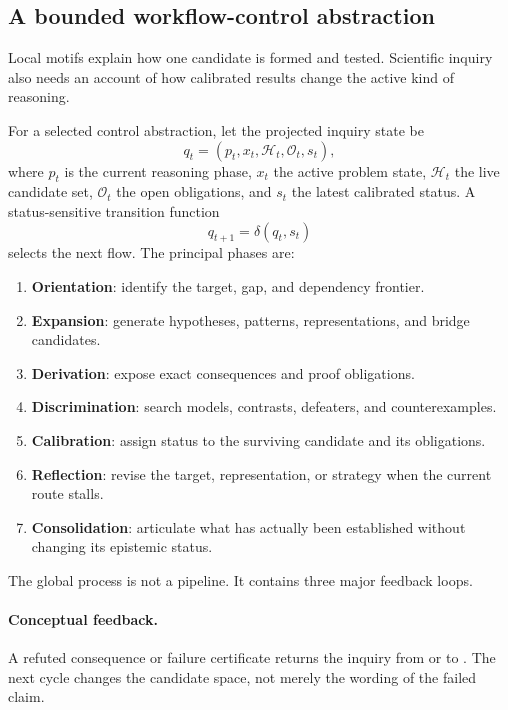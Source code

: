 \subsection{A bounded workflow-control abstraction}

Local motifs explain how one candidate is formed and tested. Scientific inquiry
also needs an account of how calibrated results change the active kind of
reasoning.

For a selected control abstraction, let the projected inquiry state be
\[
  q_t=(p_t,x_t,\mathcal{H}_t,\mathcal{O}_t,s_t),
\]
where $p_t$ is the current reasoning phase, $x_t$ the active problem state,
$\mathcal{H}_t$ the live candidate set, $\mathcal{O}_t$ the open obligations,
and $s_t$ the latest calibrated status. A status-sensitive transition function
\[
  q_{t+1}=\delta(q_t,s_t)
\]
selects the next flow. The principal phases are:

\begin{enumerate}[leftmargin=*,itemsep=0.3em]
\item \textbf{Orientation}: identify the target, gap, and dependency frontier.
\item \textbf{Expansion}: generate hypotheses, patterns, representations, and
  bridge candidates.
\item \textbf{Derivation}: expose exact consequences and proof obligations.
\item \textbf{Discrimination}: search models, contrasts, defeaters, and
  counterexamples.
\item \textbf{Calibration}: assign status to the surviving candidate and its
  obligations.
\item \textbf{Reflection}: revise the target, representation, or strategy when
  the current route stalls.
\item \textbf{Consolidation}: articulate what has actually been established
  without changing its epistemic status.
\end{enumerate}

The global process is not a pipeline. It contains three major feedback loops.

\paragraph{Conceptual feedback.}
A refuted consequence or failure certificate returns the inquiry from
 or  to
. The next cycle changes the
candidate space, not merely the wording of the failed claim.


